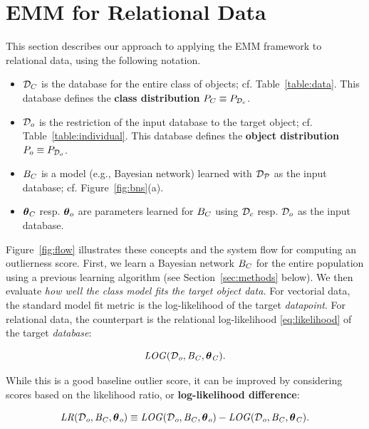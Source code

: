 \documentclass[conference]{IEEEtran}
\begin{document}
\section{EMM for Relational Data} \label{sec:metrics}

This section describes our approach to applying the EMM framework to relational data, using the following notation.
\begin{itemize}
\item $\mathcal{D}_{C}$ is the database for the entire class of objects; cf. Table~\ref{table:data}. This database defines the \textbf{class distribution} $P_{C} \equiv P_{\mathcal{D}_{c}}$.
\item $\mathcal{D}_{o}$ is the restriction of the input database to the target object; cf. Table~\ref{table:individual}. This database defines the \textbf{object distribution} $P_{o} \equiv P_{\mathcal{D}_{o}}$.
\item $B_{C}$ is a model (e.g., Bayesian network) learned with $\mathcal{D}_{\mathcal{P}}$ as the input database; cf. Figure~\ref{fig:bns}(a).
\item $\boldsymbol{\theta}_{C}$ resp. $\boldsymbol{\theta}_{o}$ are parameters learned for $B_{C}$ using $\mathcal{D}_{c}$ resp. $\mathcal{D}_{o}$ as the input database.
\end{itemize}

Figure~\ref{fig:flow} illustrates these concepts and the system flow for computing an outlierness score. First, we learn a Bayesian network $B_{C}$ for the entire population using a previous learning algorithm (see Section~\ref{sec:methods} below). We then evaluate {\em how well the class model fits the target object data.} For vectorial data, the  standard model fit metric %
is the log-likelihood of the target {\em datapoint}. For relational data, the counterpart is the relational log-likelihood \eqref{eq:likelihood} of the target {\em database}:

\begin{equation} \label{eq:loglikelihood-score}
\loglikelihood(\D_{\object},\model_{\Class},\parameters_{\Class}).
\end{equation}



While this
is a good baseline outlier score, it can be improved by considering scores based on the likelihood ratio, or {\bf log-likelihood difference}:

\begin{equation} \label{eq:log-diff}
\lr(\D_{\object},\model_{\Class},\parameters_{\object}) \equiv \loglikelihood(\D_{\object},\model_{\Class},\parameters_{\object}) - \loglikelihood(\D_{\object},\model_{\Class},\parameters_{\Class}).
\end{equation}
\end{document}
